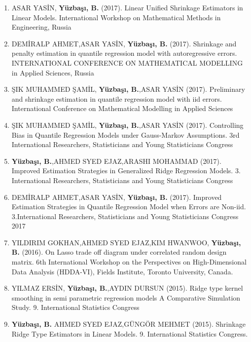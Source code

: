 \documentclass[10pt,letterpaper]{article}
\newenvironment{etaremune}{\begin{enumerate}}{\end{enumerate}}
\begin{document}
\begin{etaremune}
\item  ASAR YASİN, {\bf Y\"{u}zba\c{s}{\i}, B.} (2017).  Linear Unified Shrinkage Estimators in Linear Models.  International Workshop on Mathematical Methods in Engineering, Russia

\item  DEMİRALP AHMET,ASAR YASİN, {\bf Y\"{u}zba\c{s}{\i}, B.} (2017).  Shrinkage and penalty estimation in quantile regression model with autoregressive errors.  INTERNATIONAL CONFERENCE ON MATHEMATICAL MODELLING in Applied Sciences, Russia

\item  ŞIK MUHAMMED ŞAMİL, {\bf Y\"{u}zba\c{s}{\i}, B.},ASAR YASİN (2017).  Preliminary and shrinkage estimation in quantile regression model with iid errors.  International Conference on Mathematical Modelling in Applied Sciences

\item  ŞIK MUHAMMED ŞAMİL, {\bf Y\"{u}zba\c{s}{\i}, B.},ASAR YASİN (2017).  Controlling Bias in Quantile Regression Models under Gauss-Markov Assumptions.  3rd International Researchers, Statisticians and Young Statisticians Congress

\item  {\bf Y\"{u}zba\c{s}{\i}, B.},AHMED SYED EJAZ,ARASHI MOHAMMAD (2017).  Improved Estimation Strategies in Generalized Ridge Regression Models.  3. International Researchers, Statisticians and Young Statisticians Congress

\item  DEMİRALP AHMET,ASAR YASİN, {\bf Y\"{u}zba\c{s}{\i}, B.} (2017).  Improved Estimation Strategies in Quantile Regression Model when Errors are Non-iid.  3.International Researchers, Statisticians and Young Statisticians Congress 2017

\item  YILDIRIM GOKHAN,AHMED SYED EJAZ,KIM HWANWOO, {\bf Y\"{u}zba\c{s}{\i}, B.} (2016).  On Lasso trade off diagram under correlated random design matrix.  6th International Workshop on the Perspectives  on High-Dimensional Data Analysis (HDDA-VI), Fields Institute, Toronto University, Canada. 

\item  YILMAZ ERSİN, {\bf Y\"{u}zba\c{s}{\i}, B.},AYDIN DURSUN (2015).  Ridge type kernel smoothing in semi  parametric regression models  A Comparative Simulation Study.  9. International Statistics Congress

\item  {\bf Y\"{u}zba\c{s}{\i}, B.} AHMED SYED EJAZ,GÜNGÖR MEHMET (2015).  Shrinkage Ridge Type Estimators in Linear Models.  9. International Statistics Congress.




\end{etaremune}
\end{document}
